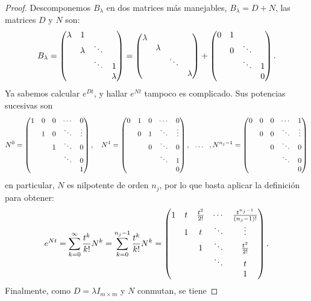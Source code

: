\documentclass[../ecuaciones_diferenciales.tex]{subfiles}
\begin{document}
\begin{proof}
	Descomponemos \(B_\lambda\) en dos matrices más manejables, 
	\(B_\lambda = D + N\), las matrices \(D\) y \(N\) son:
	\[B_\lambda = 
		\begin{pmatrix}\lambda & 1 & & \\ & \lambda & \ddots & \\ & & \ddots & 1 \\ & &
			& \lambda\end{pmatrix} =
		\begin{pmatrix}\lambda & & & \\ & \lambda & & \\ & & \ddots & \\ & & & \lambda\end{pmatrix}
		+ \begin{pmatrix}0 & 1 & & \\ & 0 & \ddots & \\ & & \ddots & 1 \\ & & & 0\end{pmatrix}.\]
	Ya sabemos calcular \(e^{Dt}\), y hallar \(e^{Nt}\) tampoco es complicado. Sus
	potencias sucesivas son
	\[
		N^0 = \begin{pmatrix}1 & 0 & 0 & \cdots & 0      \\
			& 1 & 0 & \ddots & \vdots \\
			&   & 1 & \ddots & 0      \\
			&   &   & \ddots & 0      \\
			&   &   &        & 1 \end{pmatrix}, \quad
		N^1 = \begin{pmatrix}0 & 1 & 0 & \cdots & 0      \\
			& 0 & 1 & \ddots & \vdots \\
			&   & 0 & \ddots & 0      \\
			&   &   & \ddots & 1      \\
			&   &   &        & 0 \end{pmatrix}, \ \ \dots \ \ ,
		N^{n_j-1} = \begin{pmatrix}0 & 0 & 0 & \cdots & 1      \\
			& 0 & 0 & \ddots & \vdots \\
			&   & 0 & \ddots & 0      \\
			&   &   & \ddots & 0      \\
			&   &   &        & 0 \end{pmatrix}
	\]
	en particular, \(N\) es nilpotente de orden \(n_j\), por lo que basta
	aplicar la definición para obtener:
	\[e^{Nt} = \sum_{k=0}^\infty \frac{t^k}{k!}N^k = \sum_{k=0}^{n_j-1}
		\frac{t^k}{k!}N^k =
		\begin{pmatrix}1 & t & \frac{t^2}{2!} & \cdots & \frac{t^{n_j-1}}{(n_j-1)!} \\
			& 1 & t              & \ddots & \vdots                    \\
			&   & 1              & \ddots & \frac{t^2}{2!}            \\
			&   &                & \ddots & t                         \\
			&   &                &        & 1 \end{pmatrix}.
	\]
	Finalmente, como \(D = \lambda I_{m \times m}\) y \(N\) conmutan, se tiene

\end{proof}
\end{document}
